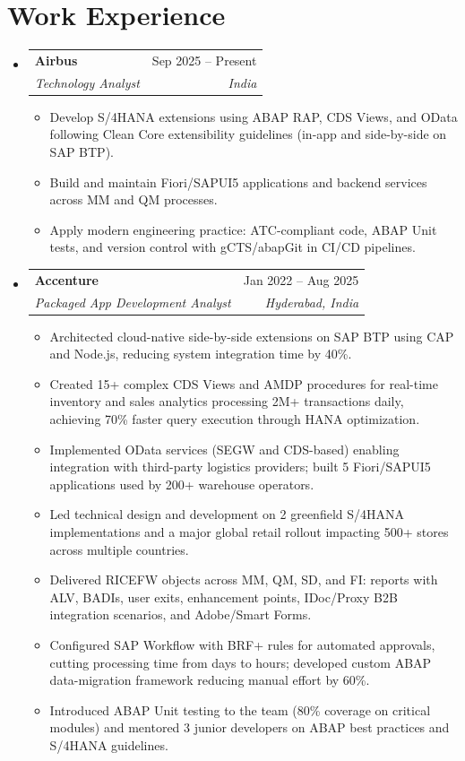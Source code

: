 \documentclass[letterpaper,11pt]{article}
\makeatletter
\newcommand{\resumeItem}[1]{
  \item\small{
    {#1 \vspace{-2pt}}
  }
}
\newcommand{\resumeSubheading}[4]{
  \vspace{-2pt}\item
    \begin{tabular*}{0.97\textwidth}[t]{l@{\extracolsep{\fill}}r}
      \textbf{#1} & #2 \\
      \textit{\small#3} & \textit{\small #4} \\
    \end{tabular*}\vspace{-7pt}
}
\newcommand{\resumeSubHeadingListStart}{\begin{itemize}[leftmargin=0.15in, label={}]}
\newcommand{\resumeSubHeadingListEnd}{\end{itemize}}
\newcommand{\resumeItemListStart}{\begin{itemize}}
\newcommand{\resumeItemListEnd}{\end{itemize}\vspace{-5pt}}
\makeatother
\begin{document}
\section{Work Experience}
  \resumeSubHeadingListStart

    \resumeSubheading
      {Airbus}{Sep 2025 -- Present}
      {Technology Analyst}{India}
      \resumeItemListStart
        \resumeItem{Develop S/4HANA extensions using ABAP RAP, CDS Views, and OData following Clean Core extensibility guidelines (in-app and side-by-side on SAP BTP).}
        \resumeItem{Build and maintain Fiori/SAPUI5 applications and backend services across MM and QM processes.}
        \resumeItem{Apply modern engineering practice: ATC-compliant code, ABAP Unit tests, and version control with gCTS/abapGit in CI/CD pipelines.}
      \resumeItemListEnd

    \resumeSubheading
      {Accenture}{Jan 2022 -- Aug 2025}
      {Packaged App Development Analyst}{Hyderabad, India}
      \resumeItemListStart
        \resumeItem{Architected cloud-native side-by-side extensions on SAP BTP using CAP and Node.js, reducing system integration time by 40\%.}
        \resumeItem{Created 15+ complex CDS Views and AMDP procedures for real-time inventory and sales analytics processing 2M+ transactions daily, achieving 70\% faster query execution through HANA optimization.}
        \resumeItem{Implemented OData services (SEGW and CDS-based) enabling integration with third-party logistics providers; built 5 Fiori/SAPUI5 applications used by 200+ warehouse operators.}
        \resumeItem{Led technical design and development on 2 greenfield S/4HANA implementations and a major global retail rollout impacting 500+ stores across multiple countries.}
        \resumeItem{Delivered RICEFW objects across MM, QM, SD, and FI: reports with ALV, BADIs, user exits, enhancement points, IDoc/Proxy B2B integration scenarios, and Adobe/Smart Forms.}
        \resumeItem{Configured SAP Workflow with BRF+ rules for automated approvals, cutting processing time from days to hours; developed custom ABAP data-migration framework reducing manual effort by 60\%.}
        \resumeItem{Introduced ABAP Unit testing to the team (80\% coverage on critical modules) and mentored 3 junior developers on ABAP best practices and S/4HANA guidelines.}

      \resumeItemListEnd

  \resumeSubHeadingListEnd

\end{document}
